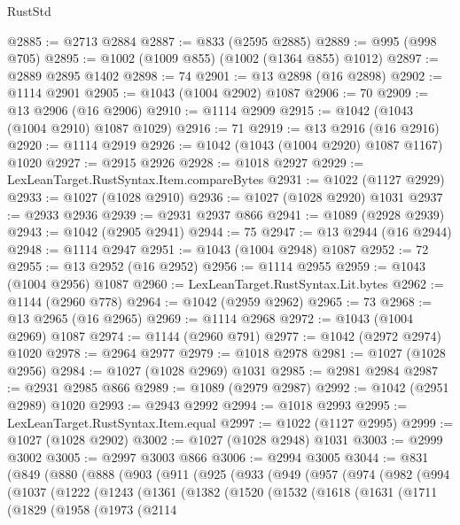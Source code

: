 \begin{lexlean}{RustStd}
\begin{coremodule}
@2885 := @2713 @2884
@2887 := @833 (@2595 @2885)
@2889 := @995 (@998 @705)
@2895 := @1002 (@1009 @855) (@1002 (@1364 @855) @1012)
@2897 := @2889 @2895 @1402
@2898 := 74
@2901 := @13 @2898 (@16 @2898)
@2902 := @1114 @2901
@2905 := @1043 (@1004 @2902) @1087
@2906 := 70
@2909 := @13 @2906 (@16 @2906)
@2910 := @1114 @2909
@2915 := @1042 (@1043 (@1004 @2910) @1087 @1029)
@2916 := 71
@2919 := @13 @2916 (@16 @2916)
@2920 := @1114 @2919
@2926 := @1042 (@1043 (@1004 @2920) @1087 @1167) @1020
@2927 := @2915 @2926
@2928 := @1018 @2927
@2929 := LexLeanTarget.RustSyntax.Item.compareBytes
@2931 := @1022 (@1127 @2929)
@2933 := @1027 (@1028 @2910)
@2936 := @1027 (@1028 @2920) @1031
@2937 := @2933 @2936
@2939 := @2931 @2937 @866
@2941 := @1089 (@2928 @2939)
@2943 := @1042 (@2905 @2941)
@2944 := 75
@2947 := @13 @2944 (@16 @2944)
@2948 := @1114 @2947
@2951 := @1043 (@1004 @2948) @1087
@2952 := 72
@2955 := @13 @2952 (@16 @2952)
@2956 := @1114 @2955
@2959 := @1043 (@1004 @2956) @1087
@2960 := LexLeanTarget.RustSyntax.Lit.bytes
@2962 := @1144 (@2960 @778)
@2964 := @1042 (@2959 @2962)
@2965 := 73
@2968 := @13 @2965 (@16 @2965)
@2969 := @1114 @2968
@2972 := @1043 (@1004 @2969) @1087
@2974 := @1144 (@2960 @791)
@2977 := @1042 (@2972 @2974) @1020
@2978 := @2964 @2977
@2979 := @1018 @2978
@2981 := @1027 (@1028 @2956)
@2984 := @1027 (@1028 @2969) @1031
@2985 := @2981 @2984
@2987 := @2931 @2985 @866
@2989 := @1089 (@2979 @2987)
@2992 := @1042 (@2951 @2989) @1020
@2993 := @2943 @2992
@2994 := @1018 @2993
@2995 := LexLeanTarget.RustSyntax.Item.equal
@2997 := @1022 (@1127 @2995)
@2999 := @1027 (@1028 @2902)
@3002 := @1027 (@1028 @2948) @1031
@3003 := @2999 @3002
@3005 := @2997 @3003 @866
@3006 := @2994 @3005
@3044 := @831
    (@849
      (@880
        (@888
          (@903
            (@911
              (@925
                (@933
                  (@949
                    (@957
                      (@974
                        (@982
                          (@994
                            (@1037
                              (@1222
                                (@1243
                                  (@1361
                                    (@1382
                                      (@1520
                                        (@1532
                                          (@1618
                                            (@1631
                                              (@1711
                                                (@1829
                                                  (@1958
                                                    (@1973
                                                      (@2114

\end{coremodule}
\end{lexlean}
